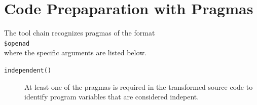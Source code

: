 \documentclass{book}
\begin{document}
\section{Code Prepaparation with Pragmas}

The tool chain recognizes pragmas of the format\\[1ex]
\hspace*{.3cm}\lstinline{$openad }{\tt\em <pragma argument>}\\[1ex] %
where the specific arguments are listed below.  
\begin{description} 
\item[\tt independent({\em <variable name>})] At least one of the pragmas is required in the transformed source 
code to identify program variables that are considered indepent.  
\end{description}

\end{document}
